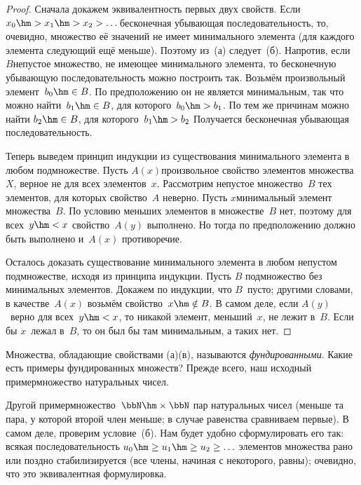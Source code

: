 \begin{proof}
Сначала докажем эквивалентность первых двух свойств. Если
$x_0\hm>x_1\hm>x_2>\dots$\т бесконечная убывающая последовательность,
то, очевидно, множество её значений не имеет минимального
элемента (для каждого элемента следующий ещё меньше).
Поэтому из~(а) следует~(б). Напротив, если $B$\т непустое
множество, не имеющее минимального элемента, то бесконечную
убывающую последовательность можно построить так. Возьмём
произвольный элемент~$b_0\hm\in B$. По предположению
он не является минимальным, так что можно найти~$b_1\hm\in B$,
для которого~$b_0\hm>b_1$. По тем же причинам можно найти $b_2\hm\in B$,
для которого~$b_1\hm>b_2$  Получается бесконечная убывающая
последовательность.

Теперь выведем принцип индукции из существования минимального
элемента в любом подмножестве. Пусть $A(x)$\т произвольное
свойство элементов множества~$X$, верное не для всех элементов~$x$.
Рассмотрим непустое множество~$B$ тех элементов, для
которых свойство~$A$ неверно. Пусть $x$\т минимальный элемент
множества~$B$.
По условию меньших элементов в множестве~$B$ нет,
поэтому для всех~$y\hm<x$ свойство~$A(y)$ выполнено. Но тогда по
предположению должно быть выполнено и~$A(x)$\т
противоречие.

Осталось доказать существование минимального элемента в любом
непустом подмножестве, исходя из принципа индукции. Пусть $B$\т
подмножество без минимальных элементов. Докажем по
индукции, что $B$~пусто; другими словами, в качестве~$A(x)$
возьмём свойство~$x\hm\notin B$. В самом деле, если $A(y)$~верно
для всех~$y\hm<x$, то никакой элемент, меньший~$x$, не
лежит в~$B$. Если бы $x$~лежал в~$B$, то он
был бы там минимальным, а таких нет.
\end{proof}

Множества, обладающие свойствами (а)\ч(в), называются
\emph{фундированными}.
Какие есть примеры фундированных множеств? Прежде всего,
наш исходный пример\т множество натуральных чисел.

Другой пример\т множество~$\bbN\hm\times\bbN$
пар натуральных чисел (меньше та пара, у которой второй
член меньше; в случае равенства сравниваем первые).
В самом деле, проверим условие~(б). Нам будет удобно
сформулировать его так: всякая последовательность
        $
u_0\hm\ge u_1\hm\ge u_2 \ge\ldots
        $
элементов множества
рано или поздно стабилизируется (все члены, начиная с
некоторого, равны); очевидно, что это эквивалентная
формулировка.

